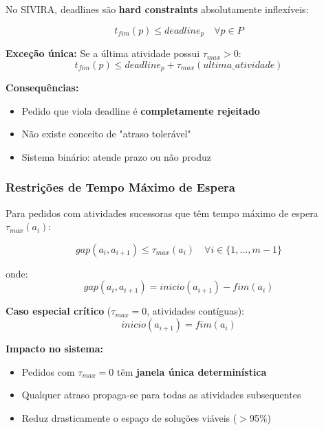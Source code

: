 \documentclass[11pt,a4paper]{article}
\begin{document}
No SIVIRA, deadlines são \textbf{hard constraints} absolutamente inflexíveis:

\begin{equation}
t_{fim}(p) \leq deadline_p \quad \forall p \in P
\end{equation}

\textbf{Exceção única:} Se a última atividade possui $\tau_{max} > 0$:
\begin{equation}
t_{fim}(p) \leq deadline_p + \tau_{max}(ultima\_atividade)
\end{equation}

\textbf{Consequências:}
\begin{itemize}
    \item Pedido que viola deadline é \textbf{completamente rejeitado}
    \item Não existe conceito de "atraso tolerável"
    \item Sistema binário: atende prazo ou não produz
\end{itemize}

\subsubsection{Restrições de Tempo Máximo de Espera}

Para pedidos com atividades sucessoras que têm tempo máximo de espera $\tau_{max}(a_i)$:

\begin{equation}
gap(a_i, a_{i+1}) \leq \tau_{max}(a_i) \quad \forall i \in \{1, ..., m-1\}
\end{equation}

onde:
\begin{equation}
gap(a_i, a_{i+1}) = inicio(a_{i+1}) - fim(a_i)
\end{equation}

\textbf{Caso especial crítico} ($\tau_{max} = 0$, atividades contíguas):
\begin{equation}
inicio(a_{i+1}) = fim(a_i)
\end{equation}

\textbf{Impacto no sistema:}
\begin{itemize}
    \item Pedidos com $\tau_{max} = 0$ têm \textbf{janela única determinística}
    \item Qualquer atraso propaga-se para todas as atividades subsequentes
    \item Reduz drasticamente o espaço de soluções viáveis ($>$95\%)
\end{itemize}
\end{document}
